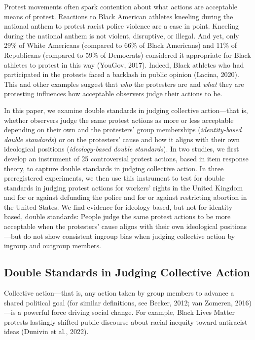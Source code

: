 \documentclass[twocolumn, 11pt, letterpaper]{article}
\begin{document}
\noindent Protest movements often spark contention about what actions
are acceptable means of protest. Reactions to Black American athletes
kneeling during the national anthem to protest racist police violence
are a case in point. Kneeling during the national anthem is not violent,
disruptive, or illegal. And yet, only 29\% of White Americans (compared
to 66\% of Black Americans) and 11\% of Republicans (compared to 59\% of
Democrats) considered it appropriate for Black athletes to protest in
this way (YouGov, 2017). Indeed, Black athletes who had participated in
the protests faced a backlash in public opinion (Lacina, 2020). This and
other examples suggest that \emph{who} the protesters are and
\emph{what} they are protesting influences how acceptable observers
judge their actions to be.

In this paper, we examine double standards in judging collective
action---that is, whether observers judge the same protest actions as
more or less acceptable depending on their own and the protesters' group
memberships (\emph{identity-based double standards}) or on the
protesters' cause and how it aligns with their own ideological positions
(\emph{ideology-based double standards}). In two studies, we first
develop an instrument of 25 controversial protest actions, based in item
response theory, to capture double standards in judging collective
action. In three preregistered experiments, we then use this instrument
to test for double standards in judging protest actions for workers'
rights in the United Kingdom and for or against defunding the police and
for or against restricting abortion in the United States. We find
evidence for ideology-based, but not for identity-based, double
standards: People judge the same protest actions to be more acceptable
when the protesters' cause aligns with their own ideological
positions---but do not show consistent ingroup bias when judging
collective action by ingroup and outgroup members.

\hypertarget{double-standards-in-judging-collective-action}{%
\subsection{Double Standards in Judging Collective
Action}\label{double-standards-in-judging-collective-action}}

Collective action---that is, any action taken by group members to
advance a shared political goal (for similar definitions, see Becker,
2012; van Zomeren, 2016)---is a powerful force driving social change.
For example, Black Lives Matter protests lastingly shifted public
discourse about racial inequity toward antiracist ideas (Dunivin et al.,
2022).
\end{document}
